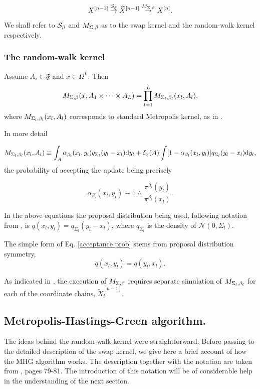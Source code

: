$$X^{[n-1]} \overset{\mathcal{S}_{\beta}}{\rightarrow} \widetilde{X}^{[n-1]} \overset{M_{\Sigma,\beta}}{\rightarrow} X^{[n]}.$$

We shall refer to $\mathcal{S}_{\beta}$ and $M_{\Sigma,\beta}$ as to the swap kernel and the random-walk kernel respectively.



	\subsubsection*{The random-walk kernel}
	
Assume $A_i \in \mathfrak{F}$ and $x \in \Omega^L$. Then $$M_{\Sigma,\beta} (x, A_1 \times \dots \times A_L) = \prod_{l=1}^L M_{\Sigma_{l},\beta_{l}}(x_l, A_l),$$
where $M_{\Sigma_{l},\beta_{l}}(x_l, A_l)$ corresponds to standard Metropolis kernel, as in \citet*{CharlesJ.Geyer}. 

In more detail 

$$M_{\Sigma_{l},\beta_{l}}(x_l, A_l) \equiv \int_A \alpha_{\beta_l} (x_l, y_l) q_{\Sigma_l} (y_l - x_l) \mathrm{d }y_l + \delta_x (A) \int [1 - \alpha_{\beta_l} (x_l, y_l)] q_{\Sigma_l} (y_l - x_l) \mathrm{d }y_l ,$$
the probability of accepting the update being precisely 

\begin{equation}\label{acceptance prob}
	\alpha_{\beta_l} (x_l, y_l)  \equiv 1 \wedge \frac{\pi^{\beta_l}(y_l)}{\pi^{\beta_l}(x_l)}.
\end{equation}


In the above equations the proposal distribution being used, following notation from \cite{CharlesJ.Geyer}, is $q(x_l,y_l) = q_{\Sigma_l} (y_l - x_l)$, where $q_{\Sigma_l}$ is the density of $\mathcal{N}(0, \Sigma_l)$. 

The simple form of Eq. \ref{acceptance prob} stems from proposal distribution symmetry, $$q(x_l,y_l) = q(y_l,x_l).$$

As indicated in \cite{BM2}, the execution of $M_{\Sigma,\beta}$ requires separate simulation of $M_{\Sigma_{l},\beta_{l}}$ for each of the coordinate chains,  $\widetilde{X}^{[n-1]}_l$.


	\subsection*{Metropolis-Hastings-Green algorithm.}

The ideas behind the random-walk kernel were straightforward. Before passing to the detailed description of the swap kernel, we give here a brief account of how the MHG algorithm works. The description together with the notation are taken from \cite{CharlesJ.Geyer}, pages 79-81. The introduction of this notation will be of considerable help in the understanding of the next section. 

